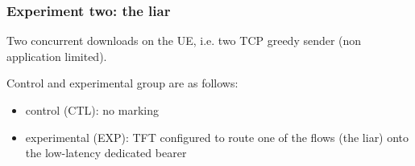 \begin{frame}
\frametitle{Experiment two: the liar}

Two concurrent downloads on the UE, i.e. two TCP greedy sender (non application limited).
\vspace{.5cm}

Control and experimental group are as follows:
\begin{itemize}
\item control (CTL): no marking
\item experimental (EXP): TFT configured to route one of the flows (the liar) onto the low-latency dedicated bearer
\end{itemize}

\end{frame}
